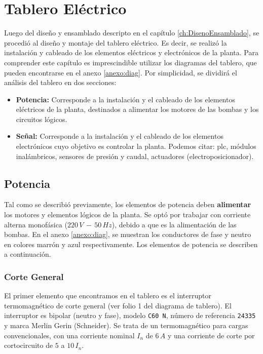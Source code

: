\chapter{Tablero Eléctrico}
\label{ch:tablero}

Luego del diseño y ensamblado descripto en el capítulo
\ref{ch:DisenoEnsamblado}, se procedió al diseño y montaje del
tablero eléctrico.
Es decir, se realizó la instalación y cableado de los elementos eléctricos y
electrónicos de la planta.
Para comprender este capítulo es imprescindible utilizar los diagramas
del tablero, que pueden encontrarse en el anexo \ref{anexo:diag}.
Por simplicidad, se dividirá el análisis del tablero en dos secciones:
\begin{itemize}
 \item \textbf{Potencia:} Corresponde a la instalación y el cableado
 de los elementos eléctricos de la planta, destinados a alimentar los motores de 
 las bombas y los circuitos lógicos.
 \item \textbf{Señal:} Corresponde a la instalación y el cableado
 de los elementos electrónicos cuyo objetivo es controlar la planta.
 Podemos citar: \gls{plc}, módulos inalámbricos,
 sensores de presión y caudal, actuadores (electroposicionador).
\end{itemize}

\section{Potencia}
\label{sec:Potencia}
Tal como se describió previamente, los elementos de potencia deben
\textbf{alimentar} los motores y elementos lógicos de la planta.
Se optó por trabajar con corriente alterna monofásica ($220\,V\,-\,50\,Hz$),
debido a que es la alimentación de las bombas.
En el anexo \ref{anexo:diag}, se muestran los conductores de fase y neutro en
colores marrón y azul respectivamente.
Los elementos de potencia se describen a continuación.

\subsection{Corte General}
El primer elemento que encontramos en el tablero es el interruptor
termomagnético de corte general (ver folio 1 del diagrama de tablero).
El interruptor es bipolar (neutro y fase), modelo \verb|C60 N|, número de
referencia \verb|24335| y marca Merlin Gerin (Schneider).
Se trata de un termomagnético para cargas convencionales, con una corriente
nominal $I_n$ de $6\,A$ y una corriente de corte por cortocircuito de $5$ a
$10\,I_n$.

